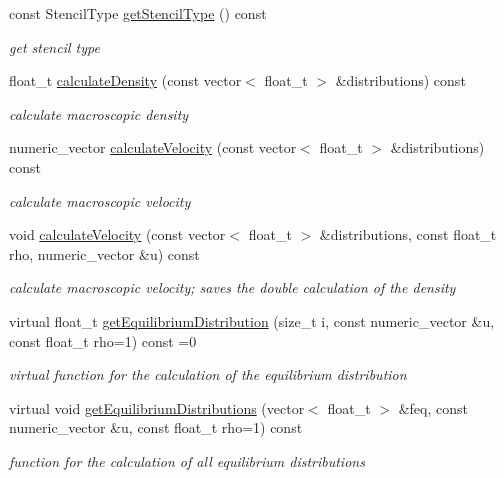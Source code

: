 \begin{DoxyCompactItemize}
const \-Stencil\-Type \hyperlink{classnatrium_1_1BoltzmannModel_ac95c2547a37e380d8d7b3de3c0f8a4c2}{get\-Stencil\-Type} () const 
\begin{DoxyCompactList}\small\item\em get stencil type \end{DoxyCompactList}\item 
float\-\_\-t \hyperlink{classnatrium_1_1BoltzmannModel_adf8901da899eef5d11b0cbf80200ee32}{calculate\-Density} (const vector$<$ float\-\_\-t $>$ \&distributions) const 
\begin{DoxyCompactList}\small\item\em calculate macroscopic density \end{DoxyCompactList}\item 
numeric\-\_\-vector \hyperlink{classnatrium_1_1BoltzmannModel_a2c7e3465bb3541e420f15a7970533047}{calculate\-Velocity} (const vector$<$ float\-\_\-t $>$ \&distributions) const 
\begin{DoxyCompactList}\small\item\em calculate macroscopic velocity \end{DoxyCompactList}\item 
void \hyperlink{classnatrium_1_1BoltzmannModel_a3d5a504ad3dc0b3847c5db412b1988b8}{calculate\-Velocity} (const vector$<$ float\-\_\-t $>$ \&distributions, const float\-\_\-t rho, numeric\-\_\-vector \&u) const 
\begin{DoxyCompactList}\small\item\em calculate macroscopic velocity; saves the double calculation of the density \end{DoxyCompactList}\item 
virtual float\-\_\-t \hyperlink{classnatrium_1_1BoltzmannModel_ac5615f43cd5c03c881734d4826ce31be}{get\-Equilibrium\-Distribution} (size\-\_\-t i, const numeric\-\_\-vector \&u, const float\-\_\-t rho=1) const =0
\begin{DoxyCompactList}\small\item\em virtual function for the calculation of the equilibrium distribution \end{DoxyCompactList}\item 
virtual void \hyperlink{classnatrium_1_1BoltzmannModel_aab8d824211e65a394536333c5537b325}{get\-Equilibrium\-Distributions} (vector$<$ float\-\_\-t $>$ \&feq, const numeric\-\_\-vector \&u, const float\-\_\-t rho=1) const 
\begin{DoxyCompactList}\small\item\em function for the calculation of all equilibrium distributions \end{DoxyCompactList}\end{DoxyCompactItemize}


